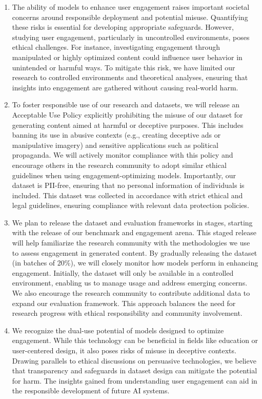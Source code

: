 \begin{enumerate} \item The ability of models to enhance user engagement raises important societal concerns around responsible deployment and potential misuse. Quantifying these risks is essential for developing appropriate safeguards. However, studying user engagement, particularly in uncontrolled environments, poses ethical challenges. For instance, investigating engagement through manipulated or highly optimized content could influence user behavior in unintended or harmful ways. To mitigate this risk, we have limited our research to controlled environments and theoretical analyses, ensuring that insights into engagement are gathered without causing real-world harm.

\item To foster responsible use of our research and datasets, we will release an Acceptable Use Policy explicitly prohibiting the misuse of our dataset for generating content aimed at harmful or deceptive purposes. This includes banning its use in abusive contexts (e.g., creating deceptive ads or manipulative imagery) and sensitive applications such as political propaganda. We will actively monitor compliance with this policy and encourage others in the research community to adopt similar ethical guidelines when using engagement-optimizing models. Importantly, our dataset is PII-free, ensuring that no personal information of individuals is included. This dataset was collected in accordance with strict ethical and legal guidelines, ensuring compliance with relevant data protection policies.

\item We plan to release the dataset and evaluation frameworks in stages, starting with the release of our benchmark and engagement arena. This staged release will help familiarize the research community with the methodologies we use to assess engagement in generated content. By gradually releasing the dataset (in batches of 20\%), we will closely monitor how models perform in enhancing engagement. Initially, the dataset will only be available in a controlled environment, enabling us to manage usage and address emerging concerns. We also encourage the research community to contribute additional data to expand our evaluation framework. This approach balances the need for research progress with ethical responsibility and community involvement.

\item We recognize the dual-use potential of models designed to optimize engagement. While this technology can be beneficial in fields like education or user-centered design, it also poses risks of misuse in deceptive contexts. Drawing parallels to ethical discussions on persuasive technologies, we believe that transparency and safeguards in dataset design can mitigate the potential for harm. The insights gained from understanding user engagement can aid in the responsible development of future AI systems.


\end{enumerate}
